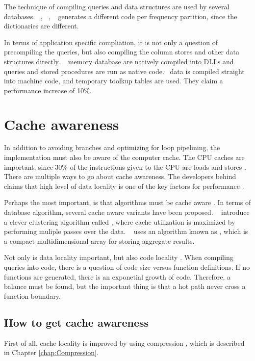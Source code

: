 The technique of compiling queries and data structures are used by several databases. \blink~\cite{Barber2012-xt}, \ibm~\cite{Raman2013-em}, \vertica~\cite{Lamb2012-kg} generates a different code per frequency partition, since the dictionaries are different. 


In terms of application specific compliation, it is not only a question of precompiling the queries, but also compiling the column stores and other data structures directly. \mssql~\cite{Delaney2014-ip} memory database are natively compiled into DLLs and queries and stored procedures are run as native code.\qlikview~\cite{noauthor_undated-js} data is compiled straight into machine code, and temporary toolkup tables are used. They claim a performance increase of 10\%.

\section{Cache awareness}
\label{sec:Cache awareness}
In addition to avoiding branches and optimizing for loop pipelining, the implementation must also be aware of the computer cache. The CPU caches are important, since 30\% of the instructions given to the CPU are loads and stores \cite{Boncz2005-wj}. There are multiple ways to go about cache awareness. The developers behind \exasol claims that high level of data locality is one of the key factors for performance \cite{Exasol2014-xh}.

Perhaps the most important, is that algorithms must be cache aware \cite{Farber2012-vh}. In terms of database algorithm, several cache aware variants have been proposed. \monetdb~\cite{Boncz2002-yj} introduce a clever clustering algorithm called , where cache utilization is maximized by performing muliple passes over the data. \oracle~\cite{Lahiri2015-mz} uses an algorithm known as , which is a compact multidimensional array for storing aggregate results.

Not only is data locality important, but also code locality \cite{Neumann2011-uq}. When compiling queries into code, there is a question of code size versus function definitions. If no functions are generated, there is an exponetial growth of code. Therefore, a balance must be found, but the important thing is that a hot path never cross a function boundary.

\subsection{How to get cache awareness}
\label{sub:How to get cache awareness}
First of all, cache locality is improved by using compression \cite{Lemke2010-is}, which is described in Chapter \ref{chap:Compression}.

